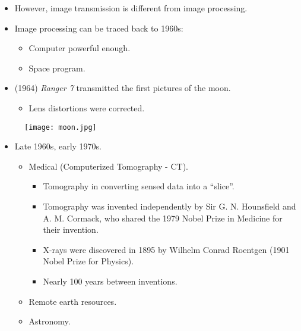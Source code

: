 
\begin{frame}
\begin{itemize}
\item However, image transmission is different from image processing.
\item Image processing can be traced back to 1960s:
\begin{itemize}
\item Computer powerful enough.
\item Space program.
\end{itemize}
\end{itemize}
\end{frame}


\begin{frame}
\begin{itemize}
\item (1964) \textit{Ranger 7} transmitted the first pictures of the moon.
\begin{itemize}
\item Lens distortions were corrected.
\end{itemize}
\end{itemize}
\begin{figure}
\texttt{[image: moon.jpg]}
\end{figure}
\end{frame}


\begin{frame}
\begin{itemize}
\item Late 1960s, early 1970s.
\begin{itemize}
\item Medical (Computerized Tomography - CT).
\begin{itemize}
\item Tomography in converting sensed data into a ``slice''.
\item Tomography was invented independently by Sir G. N. Hounsfield and A. M. Cormack, who shared the 1979 Nobel Prize in Medicine for their invention.
\item X-rays were discovered in 1895 by Wilhelm Conrad Roentgen (1901 Nobel Prize for Physics).
\item Nearly 100 years between inventions.
\end{itemize}
\item Remote earth resources.
\item Astronomy.
\end{itemize}
\end{itemize}
\end{frame}

